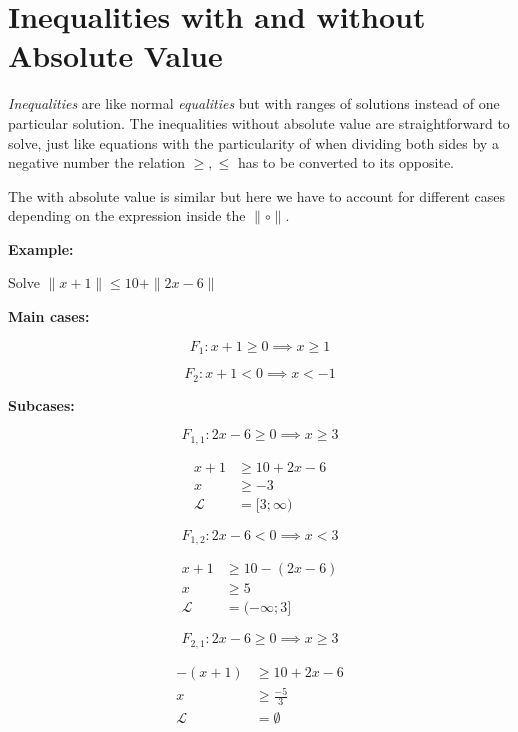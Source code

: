 \newpage
\section{Inequalities with and without Absolute Value}

\emph{Inequalities} are like normal \emph{equalities} but with ranges of solutions 
instead of one particular solution. The inequalities without absolute value are straightforward 
to solve, just like equations with the particularity of when dividing both sides by a negative number 
the relation \(<, > \ge, \le\) has to be converted to its opposite.
\vspace{\baselineskip}

The with absolute value is similar but here we have to account for different cases depending on the 
expression inside the \(\| \circ \|\).
\vspace{\baselineskip}

\textbf{Example:}
\vspace{\baselineskip}

Solve \(\|x + 1 \| \le 10 + \|2x - 6\|\)
\vspace{\baselineskip}

\textbf{Main cases:}

\[
    F_1: x + 1 \ge 0 \implies x \ge 1
\]

\[
    F_2: x + 1 < 0 \implies x < -1
\]

\textbf{Subcases:}

\[
    F_{1,1}: 2x - 6 \ge 0  \implies x \ge 3
\]

\begin{align*}
    x + 1 &\ge 10 + 2x - 6 \\
    x &\ge -3 \\
    \mathcal{L} &= [3; \infty )
\end{align*}


\[
    F_{1,2}: 2x - 6 < 0  \implies x < 3
\]

\begin{align*}
    x + 1 &\ge 10 - (2x - 6) \\
    x &\ge 5 \\
    \mathcal{L} &= (-\infty; 3]
\end{align*}

\[
    F_{2,1}: 2x - 6 \ge 0 \implies x \ge 3
\]

\begin{align*}
   -(x + 1 ) &\ge 10 + 2x - 6 \\
    x &\ge \frac{-5}{3} \\
    \mathcal{L} &= \emptyset
\end{align*}

